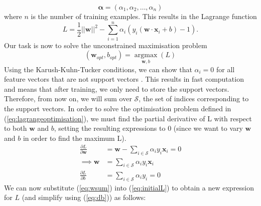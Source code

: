 \documentclass[12pt,a4paper,twoside,openright]{report}
\begin{document}
\begin{equation}
	\boldsymbol{\alpha} = (\alpha_1, \alpha_2, \ldots, \alpha_n)
\end{equation}
where $n$ is the number of training examples. This results in the Lagrange function
\begin{equation} \label{eq:initialL}
	L = \frac{1}{2}||\mathbf{w}||^2 - \sum_{i = 1}^{n} \alpha_i (y_i(\mathbf{w} \cdot \mathbf{x}_i + b) - 1). 
\end{equation}
Our task is now to solve the unconstrained maximisation problem
\begin{equation} \label{eq:lagrangeoptimisation}
	(\mathbf{w}_{opt}, b_{opt}) = \underset{\mathbf{w}, b}{\operatorname{argmax}}(L)
\end{equation}
Using the Karush-Kuhn-Tucker conditions, we can show that $\alpha_i = 0$ for all feature vectors that are not support vectors \cite{ml_book}. This results in fast computation and means that after training, we only need to store the support vectors. Therefore, from now on, we will sum over $\mathcal{S}$, the set of indices corresponding to the support vectors.
\newline
\newline
In order to solve the optimisation problem defined in (\ref{eq:lagrangeoptimisation}), we must find the partial derivative of L with respect to both $\mathbf{w}$ and $b$, setting the resulting expressions to 0 (since we want to vary $\mathbf{w}$ and $b$ in order to find the maximum L).
\begin{align}
	\frac{\partial L}{\partial \mathbf{w}} & = \mathbf{w} - \sum_{i \in \mathcal{S}} \alpha_i y_i \mathbf{x}_i = 0 \\
	\implies \mathbf{w} & = \sum_{i \in \mathcal{S}} \alpha_i y_i \mathbf{x}_i \label{eq:wsum} \\
	\frac{\partial L}{\partial b} & = \sum_{i \in \mathcal{S}} \alpha_i y_i = 0 \label{eq:db}
\end{align}
We can now substitute (\ref{eq:wsum}) into (\ref{eq:initialL}) to obtain a new expression for $L$ (and simplify using (\ref{eq:db})) as follows:
\end{document}
